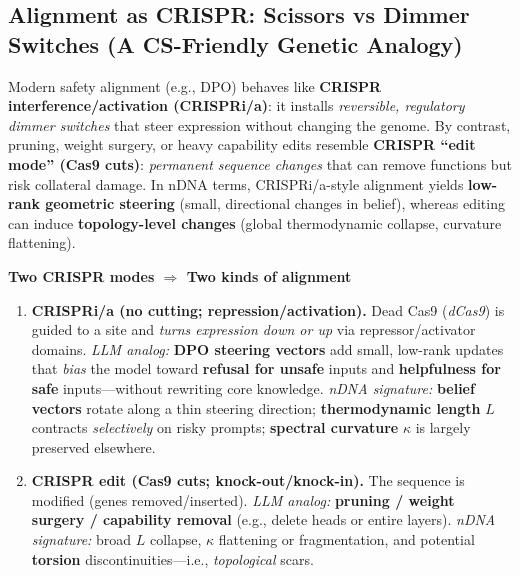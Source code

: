 \clearpage
\newpage

\subsection*{Alignment as CRISPR: \textbf{Scissors} vs \textbf{Dimmer Switches} (A CS-Friendly Genetic Analogy)}

\noindent
Modern safety alignment (e.g., DPO) behaves like \textbf{CRISPR interference/activation (CRISPRi/a)}: it installs \emph{reversible, regulatory dimmer switches} that steer expression without changing the genome.
By contrast, pruning, weight surgery, or heavy capability edits resemble \textbf{CRISPR ``edit mode'' (Cas9 cuts)}: \emph{permanent sequence changes} that can remove functions but risk collateral damage.
In nDNA terms, CRISPRi/a-style alignment yields \textbf{low-rank geometric steering} (small, directional changes in belief), whereas editing can induce \textbf{topology-level changes} (global thermodynamic collapse, curvature flattening).

\vspace{0.75em}
\noindent
\textbf{Two CRISPR modes $\Rightarrow$ Two kinds of alignment}
\begin{enumerate}
  \item \textbf{CRISPRi/a (no cutting; repression/activation).}
  Dead Cas9 (\emph{dCas9}) is guided to a site and \emph{turns expression down or up} via repressor/activator domains.
  \newline\emph{LLM analog:} \textbf{DPO steering vectors} add small, low-rank updates that \emph{bias} the model toward \textbf{refusal for unsafe} inputs and \textbf{helpfulness for safe} inputs—without rewriting core knowledge.
  \newline\emph{nDNA signature:} \textbf{belief vectors} rotate along a thin steering direction; \textbf{thermodynamic length} $L$ contracts \emph{selectively} on risky prompts; \textbf{spectral curvature} $\kappa$ is largely preserved elsewhere.
  \item \textbf{CRISPR edit (Cas9 cuts; knock-out/knock-in).}
  The sequence is modified (genes removed/inserted).
  \newline\emph{LLM analog:} \textbf{pruning / weight surgery / capability removal} (e.g., delete heads or entire layers).
  \newline\emph{nDNA signature:} broad $L$ collapse, $\kappa$ flattening or fragmentation, and potential \textbf{torsion} discontinuities—i.e., \emph{topological} scars.
\end{enumerate}

